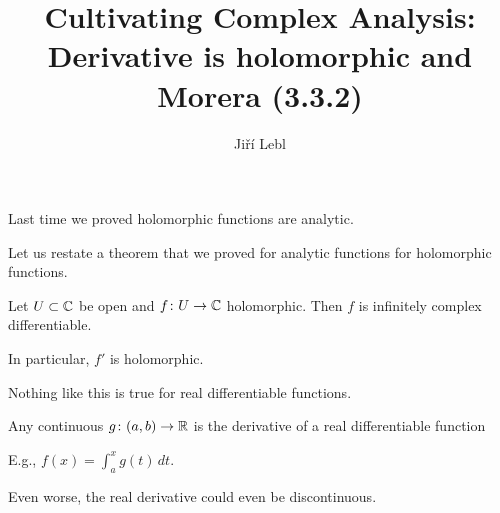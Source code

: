 \documentclass[10pt,aspectratio=169]{beamer}
\author{Ji\v{r}\'i Lebl}
\institute[OSU]{%
Departemento pri Matematiko de Oklahoma {\^S}tata Universitato}
\title{Cultivating Complex Analysis:\\%
Derivative is holomorphic and Morera (3.3.2)}
\date{}
\begin{document}
\begin{frame}
\titlepage
\end{frame}

\begin{frame}
Last time we proved holomorphic functions are analytic.

\medskip
\pause

Let us restate a theorem that we proved
for analytic functions for holomorphic functions.

\pause

\begin{theorem}
Let $U \subset {\mathbb{C}}$ be open and $f \colon U \to {\mathbb{C}}$ holomorphic.  Then
$f$ is infinitely complex differentiable.

\pause
In particular, $f'$ is holomorphic.
\end{theorem}

\pause

Nothing like this is true for real differentiable functions.

\medskip
\pause

Any continuous $g \colon (a,b) \to {\mathbb{R}}$ is the derivative of a real differentiable function

E.g., $f(x) = \int_a^x g(t)\,dt$.

\medskip
\pause

Even worse, the real derivative could even be discontinuous.

\end{frame}
\end{document}
